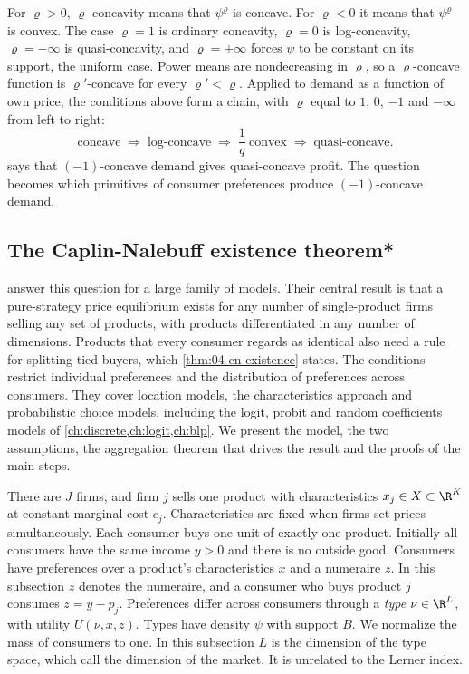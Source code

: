 For $\varrho > 0$, $\varrho$-concavity means that $\psi^\varrho$ is concave. For $\varrho < 0$ it means that $\psi^\varrho$ is convex. The
case $\varrho = 1$ is ordinary concavity, $\varrho = 0$ is log-concavity, $\varrho = -\infty$ is quasi-concavity, and
$\varrho = +\infty$ forces $\psi$ to be constant on its support, the uniform case. Power means are nondecreasing in
$\varrho$, so a $\varrho$-concave function is $\varrho'$-concave for every $\varrho' < \varrho$. Applied to demand as a function of own price,
the conditions above form a chain, with $\varrho$ equal to $1$, $0$, $-1$ and $-\infty$ from left to right:
\[
  \text{concave} \;\Longrightarrow\; \text{log-concave} \;\Longrightarrow\; \frac{1}{q}\ \text{convex} \;\Longrightarrow\; \text{quasi-concave}.
\]
 says that $(-1)$-concave demand gives quasi-concave profit. The question becomes which
primitives of consumer preferences produce $(-1)$-concave demand.

\subsection{The Caplin-Nalebuff existence theorem*}\label{sec:04-cn}

\citet{CaplinNalebuff1991} answer this question for a large family of models. Their central result is that a
pure-strategy price equilibrium exists for any number of single-product firms selling any set of products, with
products differentiated in any number of dimensions. Products that every consumer regards as identical also need a
rule for splitting tied buyers, which \cref{thm:04-cn-existence} states. The conditions restrict individual preferences and the
distribution of preferences across consumers. They cover location models, the characteristics approach and
probabilistic choice models, including the logit, probit and random coefficients models of
\cref{ch:discrete,ch:logit,ch:blp}. We present the model, the two assumptions, the aggregation theorem that
drives the result and the proofs of the main steps.

There are $J$ firms, and firm $j$ sells one product with characteristics $x_j \in X \subset \R^K$ at constant
marginal cost $c_j$. Characteristics are fixed when firms set prices simultaneously. Each consumer buys one unit
of exactly one product. Initially all consumers have the same income $y > 0$ and there is no outside good.
Consumers have preferences over a product's characteristics $x$ and a numeraire $z$. In this subsection $z$
denotes the numeraire, and a consumer who buys product $j$ consumes $z = y - p_j$. Preferences differ across
consumers through a \emph{type} $\nu \in \R^L$, with utility $U(\nu, x, z)$. Types have density $\psi$ with
support $B$. We normalize the mass of consumers to one. In this subsection $L$ is the dimension of the type
space, which \citet{CaplinNalebuff1991} call the dimension of the market. It is unrelated to the Lerner index.

